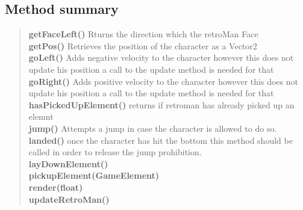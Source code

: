 \documentclass[11pt,a4paper]{report}
\begin{document}
{{{{{{{{{{\subsection{Method summary}{
\begin{verse}
{\bf getFaceLeft()} Rturns the direction which the retroMan Face\\
{\bf getPos()} Retrieves the position of the character as a Vector2\\
{\bf goLeft()} Adds negative velocity to the character however this does not update his position a call to the update method is needed for that\\
{\bf goRight()} Adds positive velocity to the character however this does not update his position a call to the update method is needed for that\\
{\bf hasPickedUpElement()} returns if retroman has already picked up an elemnt\\
{\bf jump()} Attempts a jump in case the character is allowed to do so.\\
{\bf landed()} once the character has hit the bottom this method should be called in order to release the jump prohibition.\\
{\bf layDownElement()} \\
{\bf pickupElement(GameElement)} \\
{\bf render(float)} \\
{\bf updateRetroMan()} \\
\end{verse}
}
}}}}}}}}}}
\end{document}
